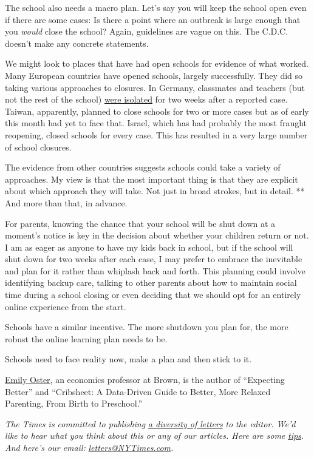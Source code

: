 The school also needs a macro plan. Let's say you will keep the school
open even if there are some cases: Is there a point where an outbreak is
large enough that you \emph{would} close the school? Again, guidelines
are vague on this. The C.D.C. doesn't make any concrete statements.

We might look to places that have had open schools for evidence of what
worked. Many European countries have opened schools, largely
successfully. They did so taking various approaches to closures. In
Germany, classmates and teachers (but not the rest of the school)
\href{https://www.sciencemag.org/news/2020/07/school-openings-across-globe-suggest-ways-keep-coronavirus-bay-despite-outbreaks}{were
isolated} for two weeks after a reported case. Taiwan, apparently,
planned to close schools for two or more cases but as of early this
month had yet to face that. Israel, which has had probably the most
fraught reopening, closed schools for every case. This has resulted in a
very large number of school closures.

The evidence from other countries suggests schools could take a variety
of approaches. My view is that the most important thing is that they are
explicit about which approach they will take. Not just in broad strokes,
but in detail. ** And more than that, in advance.

For parents, knowing the chance that your school will be shut down at a
moment's notice is key in the decision about whether your children
return or not. I am as eager as anyone to have my kids back in school,
but if the school will shut down for two weeks after each case, I may
prefer to embrace the inevitable and plan for it rather than whiplash
back and forth. This planning could involve identifying backup care,
talking to other parents about how to maintain social time during a
school closing or even deciding that we should opt for an entirely
online experience from the start.

Schools have a similar incentive. The more shutdown you plan for, the
more robust the online learning plan needs to be.

Schools need to face reality now, make a plan and then stick to it.

\href{https://www.brown.edu/research/projects/oster/}{Emily Oster}, an
economics professor at Brown, is the author of ``Expecting Better'' and
``Cribsheet: A Data-Driven Guide to Better, More Relaxed Parenting, From
Birth to Preschool.''

\emph{The Times is committed to publishing}
\href{https://www.nytimes3xbfgragh.onion/2019/01/31/opinion/letters/letters-to-editor-new-york-times-women.html}{\emph{a
diversity of letters}} \emph{to the editor. We'd like to hear what you
think about this or any of our articles. Here are some}
\href{https://help.nytimes3xbfgragh.onion/hc/en-us/articles/115014925288-How-to-submit-a-letter-to-the-editor}{\emph{tips}}\emph{.
And here's our email:}
\href{mailto:letters@NYTimes.com}{\emph{letters@NYTimes.com}}\emph{.}

